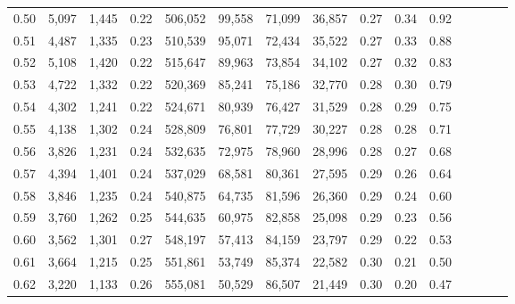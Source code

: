 \begin{tabular}{rrrcrrrrrrrrrrr}
0.50 &   5,097 &  1,445 &                                       0.22 &  506,052 &   99,558 &   71,099 &   36,857 &  0.27 &  0.34 &                         0.92 \\
0.51 &   4,487 &  1,335 &                                       0.23 &  510,539 &   95,071 &   72,434 &   35,522 &  0.27 &  0.33 &                         0.88 \\
0.52 &   5,108 &  1,420 &                                       0.22 &  515,647 &   89,963 &   73,854 &   34,102 &  0.27 &  0.32 &                         0.83 \\
0.53 &   4,722 &  1,332 &                                       0.22 &  520,369 &   85,241 &   75,186 &   32,770 &  0.28 &  0.30 &                         0.79 \\
0.54 &   4,302 &  1,241 &                                       0.22 &  524,671 &   80,939 &   76,427 &   31,529 &  0.28 &  0.29 &                         0.75 \\
0.55 &   4,138 &  1,302 &                                       0.24 &  528,809 &   76,801 &   77,729 &   30,227 &  0.28 &  0.28 &                         0.71 \\
0.56 &   3,826 &  1,231 &                                       0.24 &  532,635 &   72,975 &   78,960 &   28,996 &  0.28 &  0.27 &                         0.68 \\
0.57 &   4,394 &  1,401 &                                       0.24 &  537,029 &   68,581 &   80,361 &   27,595 &  0.29 &  0.26 &                         0.64 \\
0.58 &   3,846 &  1,235 &                                       0.24 &  540,875 &   64,735 &   81,596 &   26,360 &  0.29 &  0.24 &                         0.60 \\
0.59 &   3,760 &  1,262 &                                       0.25 &  544,635 &   60,975 &   82,858 &   25,098 &  0.29 &  0.23 &                         0.56 \\
0.60 &   3,562 &  1,301 &                                       0.27 &  548,197 &   57,413 &   84,159 &   23,797 &  0.29 &  0.22 &                         0.53 \\
0.61 &   3,664 &  1,215 &                                       0.25 &  551,861 &   53,749 &   85,374 &   22,582 &  0.30 &  0.21 &                         0.50 \\
0.62 &   3,220 &  1,133 &                                       0.26 &  555,081 &   50,529 &   86,507 &   21,449 &  0.30 &  0.20 &                         0.47 \\

\end{tabular}
